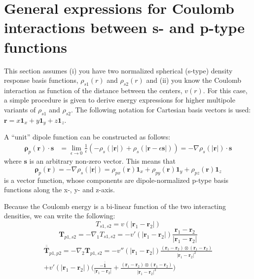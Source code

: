 \documentclass[a4paper,12pt,parskip=half]{scrartcl}
\newcommand*{\tensor}[1]{\overline{\overline{\mathbold{#1}}}}
\begin{document}
\section{General expressions for Coulomb interactions between s- and p-type functions}

This section assumes (i) you have two normalized spherical (s-type) density response basis functions, $\rho_{s1}(r)$ and $\rho_{s2}(r)$ and (ii) you know the Coulomb interaction as function of the distance between the centers, $v(r)$. For this case, a simple procedure is given to derive energy expressions for higher multipole variants of $\rho_{s1}$ and $\rho_{s2}$. The following notation for Cartesian basis vectors is used: $\mathbold{r} = x \mathbold{1}_x + y \mathbold{1}_y + z \mathbold{1}_z$.

A ``unit'' dipole function can be constructed as follows:
%
\begin{align}
    \mathbold{\rho}_p(\mathbold{r}) \cdot \mathbold{s}
        & = \lim_{\epsilon \rightarrow 0} \frac{1}{\epsilon} \left( -\rho_s(|\mathbold{r}|) + \rho_s(|\mathbold{r} - \epsilon \mathbold{s}|) \right) = -\nabla \rho_s(|\mathbold{r}|) \cdot \mathbold{s}
\end{align}
%
where $\mathbold{s}$ is an arbitrary non-zero vector. This means that
%
\begin{equation}
    \mathbold{\rho}_p(\mathbold{r}) = -\nabla \rho_s(|\mathbold{r}|) = \rho_{px}(\mathbold{r}) \mathbold{1}_x + \rho_{py}(\mathbold{r}) \mathbold{1}_y + \rho_{pz}(\mathbold{r}) \mathbold{1}_z
\end{equation}
%
is a vector function, whose components are dipole-normalized p-type basis functions along the x-, y- and z-axis.

Because the Coulomb energy is a bi-linear function of the two interacting densities, we can write the following:
%
\begin{equation}
    \label{eq:ss_general}
    T_{s1,s2} = v(|\mathbold{r}_1 - \mathbold{r}_2|)
\end{equation}
\begin{equation}
    \mathbold{T}_{p1,s2} = -\nabla_1 T_{s1,s2} = -v'(|\mathbold{r}_1 - \mathbold{r}_2|) \frac{\mathbold{r}_1 - \mathbold{r}_2}{|\mathbold{r}_1 - \mathbold{r}_2|}
\end{equation}
\begin{equation}
\begin{split}
    \label{eq:pp_general}
    \tensor{T}_{p1,p2} = -\nabla_2 \mathbold{T}_{p1,s2} =
 -v''(|\mathbold{r}_1 - \mathbold{r}_2|) \frac{(\mathbold{r}_1 - \mathbold{r}_2) \otimes (\mathbold{r}_1 - \mathbold{r}_2)}{|\mathbold{r}_1 - \mathbold{r}_2|^2} \\
       +v'(|\mathbold{r}_1 - \mathbold{r}_2|) \Biggl( \frac{-\tensor{1}}{|\mathbold{r}_1 - \mathbold{r}_2|}
            + \frac{(\mathbold{r}_1 - \mathbold{r}_2) \otimes (\mathbold{r}_1 - \mathbold{r}_2)}{|\mathbold{r}_1 - \mathbold{r}_2|^3}
            \Biggr)
\end{split}
\end{equation}
\end{document}
